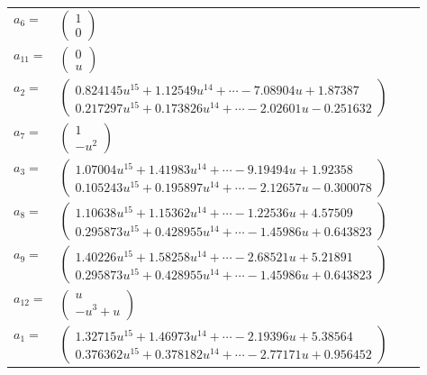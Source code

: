 \documentclass[1p]{elsarticle_modified}
\theoremstyle{definition}
\begin{document}
\begin{tabular}{m{7pt} m{180pt} m{7pt} m{180pt} }
\flushright $a_{6}=$&$\begin{pmatrix}1\\0\end{pmatrix}$ \\
\flushright $a_{11}=$&$\begin{pmatrix}0\\u\end{pmatrix}$ \\
\flushright $a_{2}=$&$\begin{pmatrix}0.824145 u^{15}+1.12549 u^{14}+\cdots-7.08904 u+1.87387\\0.217297 u^{15}+0.173826 u^{14}+\cdots-2.02601 u-0.251632\end{pmatrix}$ \\
\flushright $a_{7}=$&$\begin{pmatrix}1\\- u^2\end{pmatrix}$ \\
\flushright $a_{3}=$&$\begin{pmatrix}1.07004 u^{15}+1.41983 u^{14}+\cdots-9.19494 u+1.92358\\0.105243 u^{15}+0.195897 u^{14}+\cdots-2.12657 u-0.300078\end{pmatrix}$ \\
\flushright $a_{8}=$&$\begin{pmatrix}1.10638 u^{15}+1.15362 u^{14}+\cdots-1.22536 u+4.57509\\0.295873 u^{15}+0.428955 u^{14}+\cdots-1.45986 u+0.643823\end{pmatrix}$ \\
\flushright $a_{9}=$&$\begin{pmatrix}1.40226 u^{15}+1.58258 u^{14}+\cdots-2.68521 u+5.21891\\0.295873 u^{15}+0.428955 u^{14}+\cdots-1.45986 u+0.643823\end{pmatrix}$ \\
\flushright $a_{12}=$&$\begin{pmatrix}u\\- u^3+u\end{pmatrix}$ \\
\flushright $a_{1}=$&$\begin{pmatrix}1.32715 u^{15}+1.46973 u^{14}+\cdots-2.19396 u+5.38564\\0.376362 u^{15}+0.378182 u^{14}+\cdots-2.77171 u+0.956452\end{pmatrix}$ \\

\end{tabular}
\end{document}
